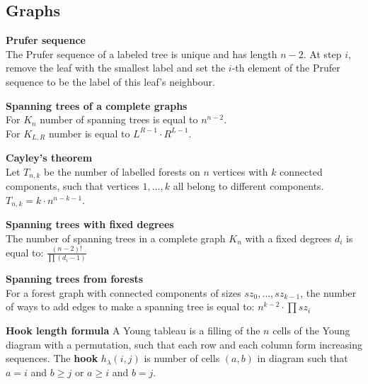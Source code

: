 \subsection{Graphs}

\textbf{Prufer sequence}\\
The Prufer sequence of a labeled tree is unique and has length $n - 2$. 
At step $i$, remove the leaf with the smallest label and set the $i$-th 
element of the Prufer sequence to be the label of this leaf's neighbour.

\textbf{Spanning trees of a complete graphs}\\
For $K_n$ number of spanning trees is equal to $n^{n - 2}$.\\
For $K_{L, R}$ number is equal to $L^{R - 1} \cdot R^{L - 1}$.

\textbf{Cayley's theorem}\\
Let $T_{n, k}$ be the number of labelled forests on $n$ vertices with $k$ connected components, 
such that vertices $1, \dots, k$ all belong to different components. 
$T_{n,k} = k \cdot n^{n - k - 1}$.

\textbf{Spanning trees with fixed degrees}\\
The number of spanning trees in a complete graph $K_{n}$ with a fixed degrees
$d_{i}$ is equal to:
$ \frac{(n - 2)!}{\prod(d_i - 1)} $

\textbf{Spanning trees from forests}\\
For a forest graph with connected components of sizes $sz_0, \dots, sz_{k - 1}$, 
the number of ways to add edges to make a spanning tree is equal to:
$ n^{k - 2} \cdot \prod sz_i$

\textbf{Hook length formula}
A Young tableau is a filling of the $n$ cells of the Young diagram with a permutation, 
such that each row and each column form increasing sequences. 
The \textbf{hook} $h_{\lambda}(i, j)$ is number of cells $(a, b)$ in diagram such that
$a = i$ and $b \ge j$ or $a \ge i$ and $b = j$.


\hfill
{}
\hfill
{}



